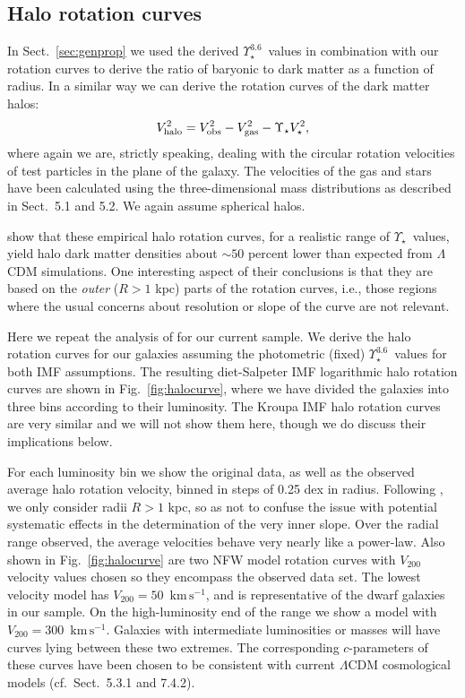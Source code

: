 \documentclass[usenatbib,usegraphicx,apjfonts,floatfix]{emulateapj}
\newcommand{\kms}{\ensuremath{\,\mbox{km}\,\mbox{s}^{-1}}}
\newcommand{\MLstar}{\ensuremath{\Upsilon_{\star}}}
\newcommand{\Ups}{\ensuremath{\Upsilon_{\star}^{3.6}}}
\begin{document}
\subsection{Halo rotation curves}

In Sect.~\ref{sec:genprop} we used the derived \Ups\ values in
combination with our rotation curves to derive the ratio of baryonic
to dark matter as a function of radius. In a similar way we can derive
the rotation curves of the dark matter halos:
\begin{equation}
V_{\rm halo}^2 = V_{\rm obs}^2 - V_{\rm gas}^2 - \MLstar V_{\star}^2,
\end{equation}
where again we are, strictly speaking, dealing with the circular
rotation velocities of test particles in the plane of the galaxy.  The
velocities of the gas and stars have been calculated using the
three-dimensional mass distributions as described in Sect.~5.1 and
5.2. We again assume spherical halos.

\citet{stacy07} show that these empirical halo rotation curves, for a
realistic range of \MLstar\ values, yield halo dark matter densities
about $\sim 50$ percent lower than expected from $\Lambda$CDM
simulations. One interesting aspect of their conclusions is that they
are based on the \emph{outer} ($R>1$ kpc) parts of the rotation
curves, i.e., those regions where the usual concerns about 
resolution or slope of the curve are not relevant.

Here we repeat the analysis of \citet{stacy07} for our current sample.
We derive the halo rotation curves for our galaxies assuming the
photometric (fixed) \Ups\ values for both IMF assumptions.  The
resulting diet-Salpeter IMF logarithmic halo rotation curves are shown
in Fig.~\ref{fig:halocurve}, where we have divided the galaxies into
three bins according to their luminosity.  The Kroupa IMF halo
rotation curves are very similar and we will not show them here,
though we do discuss their implications below.

For each luminosity bin we show the original data, as well as the
observed average halo rotation velocity, binned in steps of 0.25 dex
in radius.  Following \citet{stacy07}, we only consider radii $R>1$
kpc, so as not to confuse the issue with potential systematic effects
in the determination of the very inner slope.  Over the radial range
observed, the average velocities behave very nearly like a power-law.
Also shown in Fig.~\ref{fig:halocurve} are two NFW model rotation
curves with $V_{200}$ velocity values chosen so they encompass the
observed data set. The lowest velocity model has $V_{200} = 50$ \kms,
and is representative of the dwarf galaxies in our sample. On the
high-luminosity end of the range we show a model with $V_{200} = 300$
\kms.  Galaxies with intermediate luminosities or masses will have
curves lying between these two extremes. The corresponding
$c$-parameters of these curves have been chosen to be consistent with
current $\Lambda$CDM cosmological models (cf.~Sect.~5.3.1 and 7.4.2).
\end{document}
